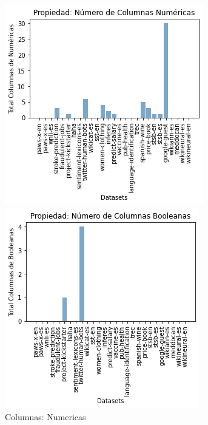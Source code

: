\begin{figure}
  \centering
    \begin{minipage}[b]{0.31\textwidth}
        \centering
        \includegraphics[width=\textwidth]{Graphics/results/columns_n.png}
          \caption{Columnas: Numericas}
          \label{fig:columns-n}
    \end{minipage}    
\hspace{0.01cm}
    \begin{minipage}[b]{0.31\textwidth}
      \centering
      \includegraphics[width=\textwidth]{Graphics/results/columns_b.png}

\end{minipage}
\end{figure}
